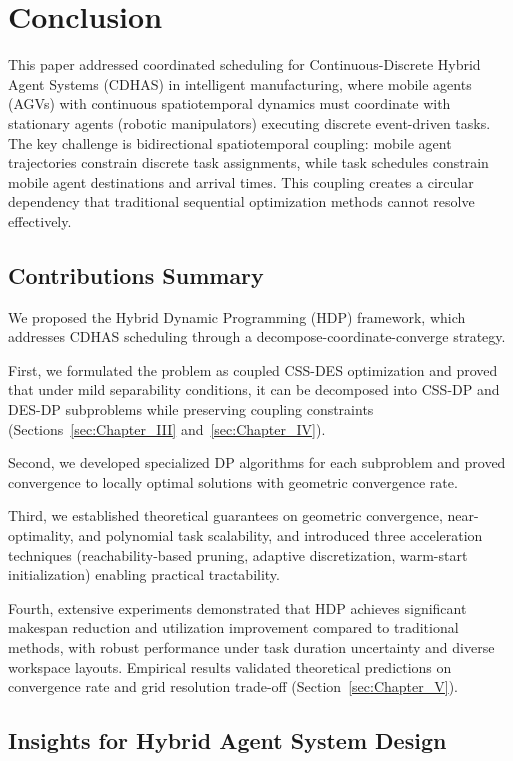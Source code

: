 \documentclass[manuscript,screen,review]{acmart}
\begin{document}
\section{Conclusion}
\label{sec:Chapter_VI}

This paper addressed coordinated scheduling for Continuous-Discrete Hybrid 
Agent Systems (CDHAS) in intelligent manufacturing, where mobile agents (AGVs) 
with continuous spatiotemporal dynamics must coordinate with stationary agents 
(robotic manipulators) executing discrete event-driven tasks. The key challenge 
is bidirectional spatiotemporal coupling: mobile agent trajectories constrain 
discrete task assignments, while task schedules constrain mobile agent 
destinations and arrival times. This coupling creates a circular dependency 
that traditional sequential optimization methods cannot resolve effectively.

\subsection{Contributions Summary}
We proposed the Hybrid Dynamic Programming (HDP) framework, which addresses
CDHAS scheduling through a decompose-coordinate-converge strategy. 

First, we formulated the problem as coupled CSS-DES optimization and proved 
that under mild separability conditions, it can be decomposed into CSS-DP and 
DES-DP subproblems while preserving coupling constraints 
(Sections~\ref{sec:Chapter_III} and~\ref{sec:Chapter_IV}). 

Second, we developed specialized DP algorithms for each subproblem and proved 
convergence to locally optimal solutions with geometric convergence rate.

Third, we established theoretical guarantees on geometric convergence, 
near-optimality, and polynomial task scalability, and introduced three 
acceleration techniques (reachability-based pruning, adaptive discretization, 
warm-start initialization) enabling practical tractability.

Fourth, extensive experiments demonstrated that HDP achieves significant 
makespan reduction and utilization improvement compared to traditional methods, 
with robust performance under task duration uncertainty and diverse workspace 
layouts. Empirical results validated theoretical predictions on convergence 
rate and grid resolution trade-off (Section~\ref{sec:Chapter_V}).

\subsection{Insights for Hybrid Agent System Design}
\end{document}
